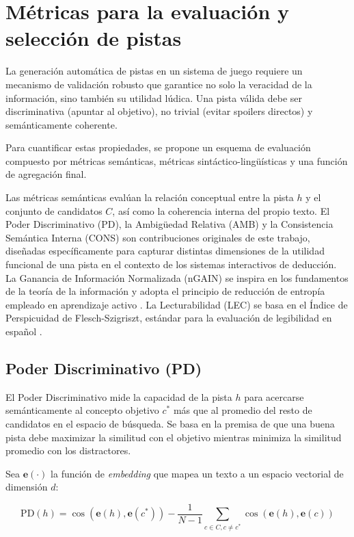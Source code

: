 \documentclass[../main.tex]{subfiles}
\begin{document}
\section{Métricas para la evaluación y selección de pistas}

La generación automática de pistas en un sistema de juego requiere un mecanismo de validación robusto que garantice no solo la veracidad de la información, sino también su utilidad lúdica. Una pista válida debe ser discriminativa (apuntar al objetivo), no trivial (evitar spoilers directos) y semánticamente coherente.

Para cuantificar estas propiedades, se propone un esquema de evaluación compuesto por métricas semánticas, métricas sintáctico-lingüísticas y una función de agregación final.

Las métricas semánticas evalúan la relación conceptual entre la pista $h$ y el conjunto de candidatos $C$, así como la coherencia interna del propio texto. El Poder Discriminativo (PD), la Ambigüedad Relativa (AMB) y la Consistencia Semántica Interna (CONS) son contribuciones originales de este trabajo, diseñadas específicamente para capturar distintas dimensiones de la utilidad funcional de una pista en el contexto de los sistemas interactivos de deducción. La Ganancia de Información Normalizada (nGAIN) se inspira en los fundamentos de la teoría de la información \cite{Shannon1948, Cover2006Elements} y adopta el principio de reducción de entropía empleado en aprendizaje activo \cite{Settles2009ActiveLearning}. La Lecturabilidad (LEC) se basa en el Índice de Perspicuidad de Flesch-Szigriszt, estándar para la evaluación de legibilidad en español \cite{szigriszt1993sistemas}.

\subsection{Poder Discriminativo (PD)}

El Poder Discriminativo mide la capacidad de la pista $h$ para acercarse semánticamente al concepto objetivo $c^*$ más que al promedio del resto de candidatos en el espacio de búsqueda. Se basa en la premisa de que una buena pista debe maximizar la similitud con el objetivo mientras minimiza la similitud promedio con los distractores.

Sea $\mathbf{e}(\cdot)$ la función de \textit{embedding} que mapea un texto a un espacio vectorial de dimensión $d$:

\begin{equation}
\text{PD}(h) =
\cos(\mathbf{e}(h), \mathbf{e}(c^*)) -
\frac{1}{N-1} \sum_{c \in C, c \neq c^*}
\cos(\mathbf{e}(h), \mathbf{e}(c))
\end{equation}
\end{document}
